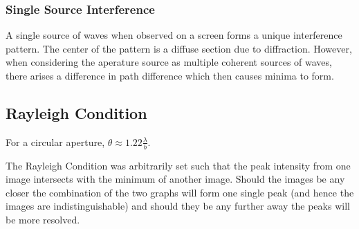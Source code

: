 \documentclass[../main]{subfiles}
\begin{document}
	\subsubsection{Single Source Interference}

	A single source of waves when observed on a screen forms a unique interference pattern. The center of the pattern is a diffuse section due to diffraction. However, when considering the aperature source as multiple coherent sources of waves, there arises a difference in path difference which then causes minima to form. 

	
	\subsection{Rayleigh Condition}



	For a circular aperture, \(\theta \approx 1.22 \frac{\lambda}{b}\).

	The Rayleigh Condition was arbitrarily set such that the peak intensity from one image intersects with the minimum of another image. Should the images be any closer the combination of the two graphs will form one single peak (and hence the images are indistinguishable) and should they be any further away the peaks will be more resolved.
\end{document}
